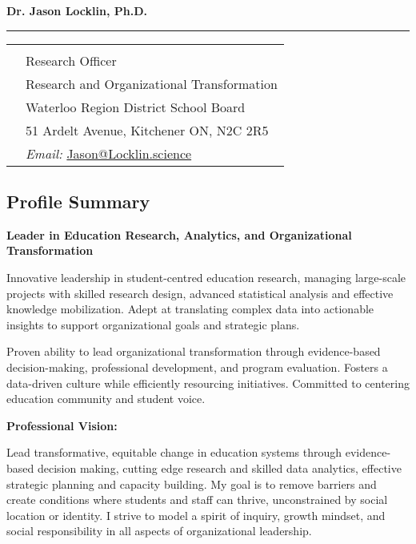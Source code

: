 \documentclass[10pt]{article}
\newcommand{\makeheading}[1]%
        {\hspace*{-\marginparsep minus \marginparwidth}%
         \begin{minipage}[t]{\textwidth+\marginparwidth+\marginparsep}%
                {\large \bfseries #1}\\[ -0.15\baselineskip]%
                 \rule{\columnwidth}{1pt}%
         \end{minipage}}
\begin{document}
\newlength{\rcollength}\setlength{\rcollength}{3in}

\makeheading{Dr. Jason Locklin, Ph.D.}

\begin{tabular}[t]{@{}p{\textwidth-\rcollength}p{\rcollength}}
    & \\
  & Research Officer\\
  & Research and Organizational Transformation \\
  & Waterloo Region District School Board \\
  & 51 Ardelt Avenue, Kitchener ON, N2C 2R5 \\
  & \textit{Email:} \href{mailto:Jason@Locklin.science}{Jason@Locklin.science}\\

\end{tabular}

\subsection{Profile Summary}\label{profile-summary}

\textbf{Leader in Education Research, Analytics, and Organizational
Transformation}

Innovative leadership in student-centred education research, managing
large-scale projects with skilled research design, advanced statistical
analysis and effective knowledge mobilization. Adept at translating
complex data into actionable insights to support organizational goals
and strategic plans.

Proven ability to lead organizational transformation through
evidence-based decision-making, professional development, and program
evaluation. Fosters a data-driven culture while efficiently resourcing
initiatives. Committed to centering education community and student
voice.

\vspace{5pt}

\textbf{Professional Vision:}

Lead transformative, equitable change in education systems through
evidence-based decision making, cutting edge research and skilled data
analytics, effective strategic planning and capacity building. My goal
is to remove barriers and create conditions where students and staff can
thrive, unconstrained by social location or identity. I strive to model
a spirit of inquiry, growth mindset, and social responsibility in all
aspects of organizational leadership.
\end{document}

